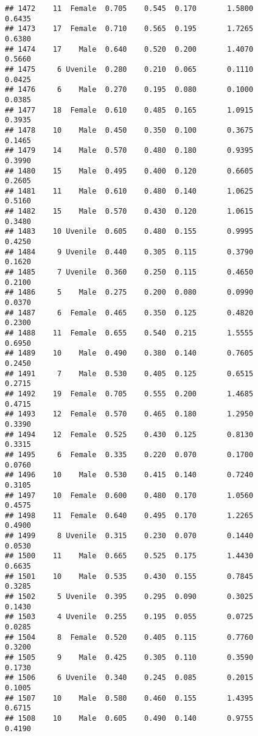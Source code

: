 \documentclass[
]{article}
\begin{document}
\begin{verbatim}
## 1472    11  Female  0.705    0.545  0.170       1.5800         0.6435
## 1473    17  Female  0.710    0.565  0.195       1.7265         0.6380
## 1474    17    Male  0.640    0.520  0.200       1.4070         0.5660
## 1475     6 Uvenile  0.280    0.210  0.065       0.1110         0.0425
## 1476     6    Male  0.270    0.195  0.080       0.1000         0.0385
## 1477    18  Female  0.610    0.485  0.165       1.0915         0.3935
## 1478    10    Male  0.450    0.350  0.100       0.3675         0.1465
## 1479    14    Male  0.570    0.480  0.180       0.9395         0.3990
## 1480    15    Male  0.495    0.400  0.120       0.6605         0.2605
## 1481    11    Male  0.610    0.480  0.140       1.0625         0.5160
## 1482    15    Male  0.570    0.430  0.120       1.0615         0.3480
## 1483    10 Uvenile  0.605    0.480  0.155       0.9995         0.4250
## 1484     9 Uvenile  0.440    0.305  0.115       0.3790         0.1620
## 1485     7 Uvenile  0.360    0.250  0.115       0.4650         0.2100
## 1486     5    Male  0.275    0.200  0.080       0.0990         0.0370
## 1487     6  Female  0.465    0.350  0.125       0.4820         0.2300
## 1488    11  Female  0.655    0.540  0.215       1.5555         0.6950
## 1489    10    Male  0.490    0.380  0.140       0.7605         0.2450
## 1491     7    Male  0.530    0.405  0.125       0.6515         0.2715
## 1492    19  Female  0.705    0.555  0.200       1.4685         0.4715
## 1493    12  Female  0.570    0.465  0.180       1.2950         0.3390
## 1494    12  Female  0.525    0.430  0.125       0.8130         0.3315
## 1495     6  Female  0.335    0.220  0.070       0.1700         0.0760
## 1496    10    Male  0.530    0.415  0.140       0.7240         0.3105
## 1497    10  Female  0.600    0.480  0.170       1.0560         0.4575
## 1498    11  Female  0.640    0.495  0.170       1.2265         0.4900
## 1499     8 Uvenile  0.315    0.230  0.070       0.1440         0.0530
## 1500    11    Male  0.665    0.525  0.175       1.4430         0.6635
## 1501    10    Male  0.535    0.430  0.155       0.7845         0.3285
## 1502     5 Uvenile  0.395    0.295  0.090       0.3025         0.1430
## 1503     4 Uvenile  0.255    0.195  0.055       0.0725         0.0285
## 1504     8  Female  0.520    0.405  0.115       0.7760         0.3200
## 1505     9    Male  0.425    0.305  0.110       0.3590         0.1730
## 1506     6 Uvenile  0.340    0.245  0.085       0.2015         0.1005
## 1507    10    Male  0.580    0.460  0.155       1.4395         0.6715
## 1508    10    Male  0.605    0.490  0.140       0.9755         0.4190

\end{verbatim}
\end{document}
